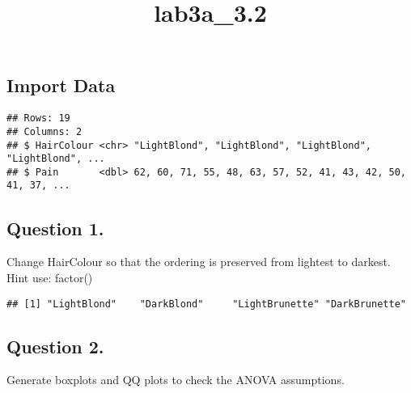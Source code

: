 \documentclass[
]{article}
\title{lab3a\_3.2}
\author{}
\date{\vspace{-2.5em}}
\newenvironment{Shaded}{\begin{snugshade}}{\end{snugshade}}
\newcommand{\DataTypeTok}[1]{\textcolor[rgb]{0.13,0.29,0.53}{#1}}
\newcommand{\KeywordTok}[1]{\textcolor[rgb]{0.13,0.29,0.53}{\textbf{#1}}}
\newcommand{\NormalTok}[1]{#1}
\newcommand{\OperatorTok}[1]{\textcolor[rgb]{0.81,0.36,0.00}{\textbf{#1}}}
\newcommand{\StringTok}[1]{\textcolor[rgb]{0.31,0.60,0.02}{#1}}
\begin{document}
\maketitle

\hypertarget{import-data}{%
\subsection{Import Data}\label{import-data}}

\begin{verbatim}
## Rows: 19
## Columns: 2
## $ HairColour <chr> "LightBlond", "LightBlond", "LightBlond", "LightBlond", ...
## $ Pain       <dbl> 62, 60, 71, 55, 48, 63, 57, 52, 41, 43, 42, 50, 41, 37, ...
\end{verbatim}

\hypertarget{question-1.}{%
\subsection{Question 1.}\label{question-1.}}

Change HairColour so that the ordering is preserved from lightest to
darkest. Hint use: factor()

\begin{Shaded}
\end{Shaded}

\begin{verbatim}
## [1] "LightBlond"    "DarkBlond"     "LightBrunette" "DarkBrunette"
\end{verbatim}

\hypertarget{question-2.}{%
\subsection{Question 2.}\label{question-2.}}

Generate boxplots and QQ plots to check the ANOVA assumptions.
\end{document}
